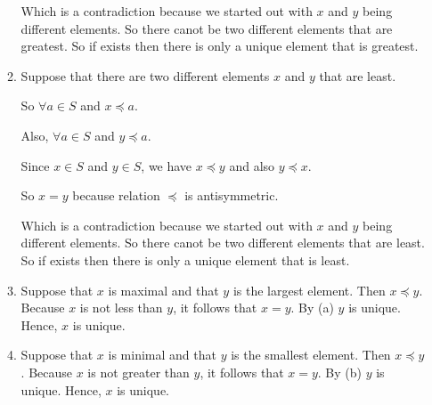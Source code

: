 \documentclass{sig-alternate-05-2015}
\begin{document}
\begin{enumerate}
\begin{enumerate}
		Which is a contradiction because we started out with $x$ and $y$ being different
		elements. So there canot be two different elements that are greatest. So if
		exists then there is only a unique element that is greatest.

		\item Suppose that there are two different elements $x$ and $y$ that are least.
		
		So $\forall a \in S$ and $x\preceq a$. 
		
		Also, $\forall a \in S$ and $y\preceq a$. 
		
		Since $x \in S$ and $y\in S$, we have $x\preceq y$ and also $y \preceq x$. 
		
		So $x=y$ because relation $\preceq$ is antisymmetric.
		
		Which is a contradiction because we started out with $x$ and $y$ being different
		elements. So there canot be two different elements that are least. So if
		exists then there is only a unique element that is least.
		
		\item Suppose that $x$ is maximal and that $y$ is the largest
		element. Then $x \preceq y$. Because $x$ is not less than $y$, it follows
		that $x = y$. By (a) $y$ is unique. Hence, $x$ is
		unique.
		\item Suppose that $x$ is minimal and that $y$ is the smallest
		element. Then $x \preceq y$. Because $x$ is not greater than $y$, it follows
		 that $x = y$. By (b) $y$ is unique. Hence, $x$ is unique.
	\end{enumerate}
\end{enumerate}
\end{document}
